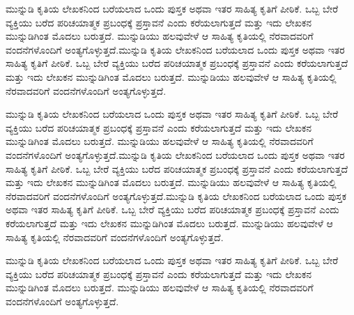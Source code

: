 \begin{center}
\Large\textbf{\color{blue}{ಮುನ್ನುಡಿ}}
\end{center}
\vspace{1cm}
ಮುನ್ನುಡಿ ಕೃತಿಯ ಲೇಖಕನಿಂದ ಬರೆಯಲಾದ ಒಂದು ಪುಸ್ತಕ ಅಥವಾ ಇತರ ಸಾಹಿತ್ಯ ಕೃತಿಗೆ ಪೀಠಿಕೆ. ಒಬ್ಬ ಬೇರೆ ವ್ಯಕ್ತಿಯು ಬರೆದ ಪರಿಚಯಾತ್ಮಕ ಪ್ರಬಂಧಕ್ಕೆ ಪ್ರಸ್ತಾವನೆ ಎಂದು ಕರೆಯಲಾಗುತ್ತದೆ ಮತ್ತು ಇದು ಲೇಖಕನ ಮುನ್ನುಡಿಗಿಂತ ಮೊದಲು ಬರುತ್ತದೆ. ಮುನ್ನುಡಿಯು ಹಲವುವೇಳೆ ಆ ಸಾಹಿತ್ಯ ಕೃತಿಯಲ್ಲಿ ನೆರವಾದವರಿಗೆ ವಂದನೆಗಳೊಂದಿಗೆ ಅಂತ್ಯಗೊಳ್ಳುತ್ತದೆ.ಮುನ್ನುಡಿ ಕೃತಿಯ ಲೇಖಕನಿಂದ ಬರೆಯಲಾದ ಒಂದು ಪುಸ್ತಕ ಅಥವಾ ಇತರ ಸಾಹಿತ್ಯ ಕೃತಿಗೆ ಪೀಠಿಕೆ. ಒಬ್ಬ ಬೇರೆ ವ್ಯಕ್ತಿಯು ಬರೆದ ಪರಿಚಯಾತ್ಮಕ ಪ್ರಬಂಧಕ್ಕೆ ಪ್ರಸ್ತಾವನೆ ಎಂದು ಕರೆಯಲಾಗುತ್ತದೆ ಮತ್ತು ಇದು ಲೇಖಕನ ಮುನ್ನುಡಿಗಿಂತ ಮೊದಲು ಬರುತ್ತದೆ. ಮುನ್ನುಡಿಯು ಹಲವುವೇಳೆ ಆ ಸಾಹಿತ್ಯ ಕೃತಿಯಲ್ಲಿ ನೆರವಾದವರಿಗೆ ವಂದನೆಗಳೊಂದಿಗೆ ಅಂತ್ಯಗೊಳ್ಳುತ್ತದೆ.
\vspace{1cm}

ಮುನ್ನುಡಿ ಕೃತಿಯ ಲೇಖಕನಿಂದ ಬರೆಯಲಾದ ಒಂದು ಪುಸ್ತಕ ಅಥವಾ ಇತರ ಸಾಹಿತ್ಯ ಕೃತಿಗೆ ಪೀಠಿಕೆ. ಒಬ್ಬ ಬೇರೆ ವ್ಯಕ್ತಿಯು ಬರೆದ ಪರಿಚಯಾತ್ಮಕ ಪ್ರಬಂಧಕ್ಕೆ ಪ್ರಸ್ತಾವನೆ ಎಂದು ಕರೆಯಲಾಗುತ್ತದೆ ಮತ್ತು ಇದು ಲೇಖಕನ ಮುನ್ನುಡಿಗಿಂತ ಮೊದಲು ಬರುತ್ತದೆ. ಮುನ್ನುಡಿಯು ಹಲವುವೇಳೆ ಆ ಸಾಹಿತ್ಯ ಕೃತಿಯಲ್ಲಿ ನೆರವಾದವರಿಗೆ ವಂದನೆಗಳೊಂದಿಗೆ ಅಂತ್ಯಗೊಳ್ಳುತ್ತದೆ.ಮುನ್ನುಡಿ ಕೃತಿಯ ಲೇಖಕನಿಂದ ಬರೆಯಲಾದ ಒಂದು ಪುಸ್ತಕ ಅಥವಾ ಇತರ ಸಾಹಿತ್ಯ ಕೃತಿಗೆ ಪೀಠಿಕೆ. ಒಬ್ಬ ಬೇರೆ ವ್ಯಕ್ತಿಯು ಬರೆದ ಪರಿಚಯಾತ್ಮಕ ಪ್ರಬಂಧಕ್ಕೆ ಪ್ರಸ್ತಾವನೆ ಎಂದು ಕರೆಯಲಾಗುತ್ತದೆ ಮತ್ತು ಇದು ಲೇಖಕನ ಮುನ್ನುಡಿಗಿಂತ ಮೊದಲು ಬರುತ್ತದೆ. ಮುನ್ನುಡಿಯು ಹಲವುವೇಳೆ ಆ ಸಾಹಿತ್ಯ ಕೃತಿಯಲ್ಲಿ ನೆರವಾದವರಿಗೆ ವಂದನೆಗಳೊಂದಿಗೆ ಅಂತ್ಯಗೊಳ್ಳುತ್ತದೆ.ಮುನ್ನುಡಿ ಕೃತಿಯ ಲೇಖಕನಿಂದ ಬರೆಯಲಾದ ಒಂದು ಪುಸ್ತಕ ಅಥವಾ ಇತರ ಸಾಹಿತ್ಯ ಕೃತಿಗೆ ಪೀಠಿಕೆ. ಒಬ್ಬ ಬೇರೆ ವ್ಯಕ್ತಿಯು ಬರೆದ ಪರಿಚಯಾತ್ಮಕ ಪ್ರಬಂಧಕ್ಕೆ ಪ್ರಸ್ತಾವನೆ ಎಂದು ಕರೆಯಲಾಗುತ್ತದೆ ಮತ್ತು ಇದು ಲೇಖಕನ ಮುನ್ನುಡಿಗಿಂತ ಮೊದಲು ಬರುತ್ತದೆ. ಮುನ್ನುಡಿಯು ಹಲವುವೇಳೆ ಆ ಸಾಹಿತ್ಯ ಕೃತಿಯಲ್ಲಿ ನೆರವಾದವರಿಗೆ ವಂದನೆಗಳೊಂದಿಗೆ ಅಂತ್ಯಗೊಳ್ಳುತ್ತದೆ.

\vspace{1cm}
ಮುನ್ನುಡಿ ಕೃತಿಯ ಲೇಖಕನಿಂದ ಬರೆಯಲಾದ ಒಂದು ಪುಸ್ತಕ ಅಥವಾ ಇತರ ಸಾಹಿತ್ಯ ಕೃತಿಗೆ ಪೀಠಿಕೆ. ಒಬ್ಬ ಬೇರೆ ವ್ಯಕ್ತಿಯು ಬರೆದ ಪರಿಚಯಾತ್ಮಕ ಪ್ರಬಂಧಕ್ಕೆ ಪ್ರಸ್ತಾವನೆ ಎಂದು ಕರೆಯಲಾಗುತ್ತದೆ ಮತ್ತು ಇದು ಲೇಖಕನ ಮುನ್ನುಡಿಗಿಂತ ಮೊದಲು ಬರುತ್ತದೆ. ಮುನ್ನುಡಿಯು ಹಲವುವೇಳೆ ಆ ಸಾಹಿತ್ಯ ಕೃತಿಯಲ್ಲಿ ನೆರವಾದವರಿಗೆ ವಂದನೆಗಳೊಂದಿಗೆ ಅಂತ್ಯಗೊಳ್ಳುತ್ತದೆ.
\vspace{1cm}